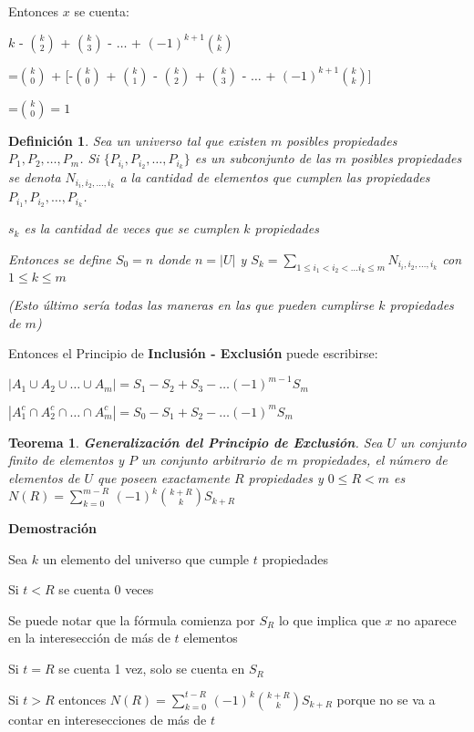 \documentclass[a4paper,12pt]{report}
\newtheorem*{teo}{Teorema}
\newtheorem*{dfn}{Definición}
\begin{document}
Entonces $x$ se cuenta:

$k$ - $k\choose 2$ + $k\choose 3$ - $\dots$ + $(-1)^{k+1}$$k\choose k$

=$k\choose 0$ + [-$k\choose 0$ + $k\choose 1$ - $k\choose 2$ + $k\choose 3$ - $\dots$ + $(-1)^{k+1}$$k\choose k$]

=$k\choose 0$$=1$




\begin{dfn}
Sea un universo tal que existen $m$ posibles propiedades $P_1,P_2,\dots,P_m$. Si $\{P_{i_i},P_{i_2},\dots,P_{i_k}\}$ es un subconjunto de las $m$ posibles propiedades se denota 
$N_{i_i,i_2,\dots,i_k}$ a la cantidad de elementos que cumplen las propiedades 
$P_{i_1},P_{i_2},\dots,P_{i_k}$. 

$s_k$ es la cantidad de veces que se cumplen $k$ propiedades
 
Entonces se define $S_0=n$ donde $n=|U|$ y 
$S_k=\sum_{1\leq i_1 < i_2 < \dots i_k \leq m} N_{i_i,i_2,\dots,i_k}$ con $1\leq k \leq m$

(Esto último sería todas las maneras en las que pueden cumplirse $k$ propiedades de $m$)
\end{dfn}


Entonces el Principio de \textbf{Inclusión - Exclusión} puede escribirse:

$|A_1\cup A_2\cup \dots \cup A_m| = S_1 - S_2 + S_3 - \dots (-1)^{m-1}S_m$

$|A_1^c\cap A_2^c\cap \dots \cap A_m^c| = S_0 - S_1 + S_2 - \dots (-1)^{m}S_m$

\begin{teo}
 \textbf{Generalización del Principio de Exclusión}. Sea $U$ un conjunto finito de elementos y $P$ un conjunto arbitrario de $m$ propiedades, el número de elementos de $U$ que poseen exactamente $R$ propiedades y $0\leq R < m$ es
 $N(R) = \sum^{m-R}_{k=0}\, (-1)^k$${k+R}\choose{k}$$S_{k+R}$
\end{teo}

\textbf{Demostración}

Sea $k$ un elemento del universo que cumple $t$ propiedades

Si $t<R$ se cuenta 0 veces

Se puede notar que la fórmula comienza por $S_R$ lo que implica que $x$ no aparece en la interesección de más de $t$ elementos

Si $t=R$ se cuenta 1 vez, solo se cuenta en $S_R$

Si $t>R$ entonces $N(R) = \sum^{t-R}_{k=0}\, (-1)^k$${k+R}\choose{k}$$S_{k+R}$ porque no se va a contar en interesecciones de más de $t$
\end{document}

